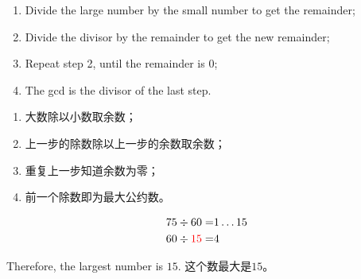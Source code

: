 \begin{newalg}
\begin{enumerate}
\item Divide the large number by the small number to get the remainder;
\item Divide the divisor by the remainder to get the new remainder;
\item Repeat step 2, until the remainder is 0;
\item The gcd is the divisor of the last step.
\end{enumerate}

\begin{enumerate}
\item 大数除以小数取余数；
\item 上一步的除数除以上一步的余数取余数；
\item 重复上一步知道余数为零；
\item 前一个除数即为最大公约数。
\end{enumerate}
\end{newalg}

\begin{solution}
\begin{align*}
75\div 60 = & 1 \ldots 15 \\ 
60\div {\color{red} 15} = & 4
\end{align*}

\begin{paracol}{2}
 Therefore, the largest number is $15$.
\switchcolumn 
这个数最大是$15$。
\end{paracol}
\end{solution}
\newpage
